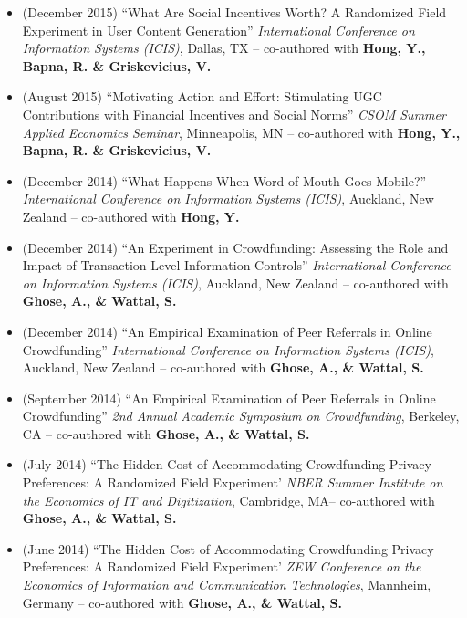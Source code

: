 \documentclass[10.5pt,letterpaper,sans]{moderncv}        %
\begin{document}
\begin{itemize}
\item (December 2015) ``What Are Social Incentives Worth? A Randomized Field Experiment in User Content Generation'' \textit{International Conference on Information Systems (ICIS)}, Dallas, TX -- co-authored with \textbf{Hong, Y., Bapna, R. \& Griskevicius, V.}

\item (August 2015) ``Motivating Action and Effort: Stimulating UGC Contributions with Financial Incentives and Social Norms'' \textit{CSOM Summer Applied Economics Seminar}, Minneapolis, MN -- co-authored with \textbf{Hong, Y., Bapna, R. \& Griskevicius, V.}

\item (December 2014) ``What Happens When Word of Mouth Goes Mobile?'' \textit{International Conference on Information Systems (ICIS)}, Auckland, New Zealand -- co-authored with \textbf{Hong, Y.}

\item (December 2014) ``An Experiment in Crowdfunding: Assessing the Role and Impact of Transaction-Level Information Controls'' \textit{International Conference on Information Systems (ICIS)}, Auckland, New Zealand -- co-authored with \textbf{Ghose, A., \& Wattal, S.}

\item (December 2014) ``An Empirical Examination of Peer Referrals in Online Crowdfunding'' \textit{International Conference on Information Systems (ICIS)}, Auckland, New Zealand -- co-authored with \textbf{Ghose, A., \& Wattal, S.}

\item (September 2014) ``An Empirical Examination of Peer Referrals in Online Crowdfunding'' \textit{2nd Annual Academic Symposium on Crowdfunding}, Berkeley, CA -- co-authored with \textbf{Ghose, A., \& Wattal, S.}

\item (July 2014) ``The Hidden Cost of Accommodating Crowdfunding Privacy Preferences: A Randomized Field Experiment' \textit{NBER Summer Institute on the Economics of IT and Digitization}, Cambridge, MA-- co-authored with \textbf{Ghose, A., \& Wattal, S.}

\item (June 2014) ``The Hidden Cost of Accommodating Crowdfunding Privacy Preferences: A Randomized Field Experiment' \textit{ZEW Conference on the Economics of Information and Communication Technologies}, Mannheim, Germany -- co-authored with \textbf{Ghose, A., \& Wattal, S.}


\end{itemize}
\end{document}
